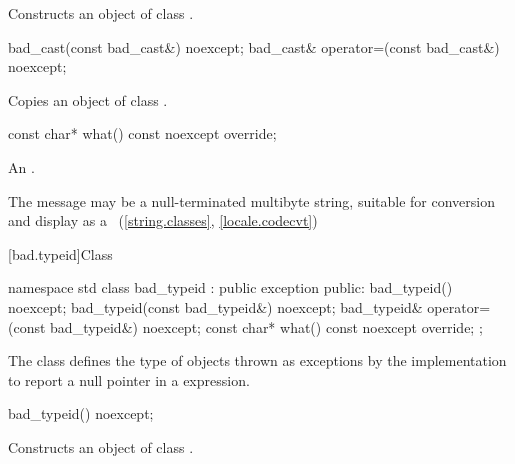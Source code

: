 \begin{itemdescr}
\pnum
\effects
Constructs an object of class
.
\end{itemdescr}

%
%
\begin{itemdecl}
bad_cast(const bad_cast&) noexcept;
bad_cast& operator=(const bad_cast&) noexcept;
\end{itemdecl}

\begin{itemdescr}
\pnum
\effects
Copies an object of class
.
\end{itemdescr}

%
\begin{itemdecl}
const char* what() const noexcept override;
\end{itemdecl}

\begin{itemdescr}
\pnum
\returns
An  \ntbs{}.

\pnum
\remarks
The message may be a null-terminated multibyte string,
suitable for conversion and display as a
~(\ref{string.classes}, \ref{locale.codecvt})
\end{itemdescr}

[bad.typeid]{Class }

%
\begin{codeblock}
namespace std {
  class bad_typeid : public exception {
  public:
    bad_typeid() noexcept;
    bad_typeid(const bad_typeid&) noexcept;
    bad_typeid& operator=(const bad_typeid&) noexcept;
    const char* what() const noexcept override;
  };
}
\end{codeblock}

\pnum
The class
defines the type of objects
thrown as exceptions by the implementation to report a null pointer
in a
expression.

%
\begin{itemdecl}
bad_typeid() noexcept;
\end{itemdecl}

\begin{itemdescr}
\pnum
\effects
Constructs an object of class
.
\end{itemdescr}

